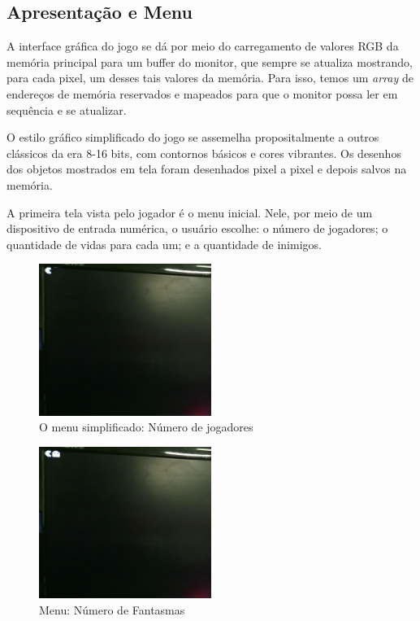 \documentclass[12pt, a4paper, twocolumn]{article}
\begin{document}
\subsection{Apresentação e Menu}

A interface gráfica do jogo se dá por meio do carregamento de valores RGB da memória principal para um buffer do monitor, que sempre se atualiza mostrando, para cada pixel, um desses tais valores da memória. Para isso, temos um \textit{array} de endereços de memória reservados e mapeados para que o monitor possa ler em sequência e se atualizar.

O estilo gráfico simplificado do jogo se assemelha propositalmente a outros clássicos da era 8-16 bits, com contornos básicos e cores vibrantes. Os desenhos dos objetos mostrados em tela foram desenhados pixel a pixel e depois salvos na memória.

A primeira tela vista pelo jogador é o menu inicial. Nele, por meio de um dispositivo de entrada numérica, o usuário escolhe: o número de jogadores; o quantidade de vidas para cada um; e a quantidade de inimigos.

\begin{figure}[h!]
    \centering
    \includegraphics[width=0.5\textwidth]{MENUPAC.jpeg}
    \caption{O menu simplificado: Número de jogadores}
\end{figure}

\newpage

 \begin{figure}[h!]
    \centering
    \includegraphics[width=0.5\textwidth]{MENU.jpeg}
    \caption{Menu: Número de Fantasmas}
\end{figure}
\end{document}
